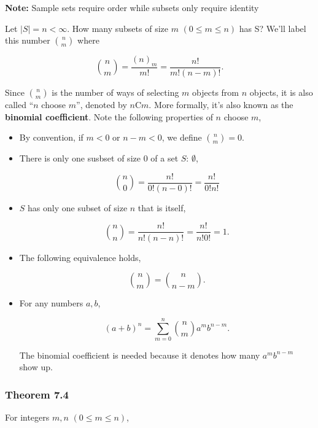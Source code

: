\documentclass[12pt]{article}
\begin{document}
\noindent
\textbf{Note:} Sample sets require order while subsets only require identity

\noindent
Let $\lvert S \rvert = n < \infty$. How many subsets of size $m$ $(0 \leq m \leq n)$ has S? We'll label this number ${n \choose m}$ where

\begin{equation*}
{n \choose m} = \frac{(n)_m}{m!} = \frac{n!}{m! (n-m)!}.
\end{equation*}

\noindent
Since ${n \choose m}$ is the number of ways of selecting $m$ objects from $n$ objects, it is also called ``$n$ choose $m$'', denoted by $n$C$m$. More formally, it's also known as the \textbf{binomial coefficient}. Note the following properties of $n$ choose $m$,

\begin{itemize}
\item By convention, if $m < 0$ or $n-m < 0$, we define ${n \choose m} = 0$.
\item There is only one susbset of size $0$ of a set $S$: $\emptyset$,

\begin{equation*}
{n \choose 0} = \frac{n!}{0! (n - 0)!} = \frac{n!}{0! n!}
\end{equation*}

\item $S$ has only one subset of size $n$ that is itself,

\begin{equation*}
{n \choose n} = \frac{n!}{n! (n-n)!} = \frac{n!}{n! 0!} = 1.
\end{equation*}

\item The following equivalence holds,

\begin{equation*}
{n \choose m} = {n \choose n-m}.
\end{equation*}

\item For any numbers $a,b$,

\begin{equation*}
(a+b)^n = \sum_{m=0}^{n} {n \choose m} a^m b^{n-m}.
\end{equation*} 

\noindent
The binomial coefficient is needed because it denotes how many $a^m b^{n-m}$ show up. 
\end{itemize}

\noindent
\subsubsection*{Theorem 7.4} For integers $m,n$ $(0 \leq m \leq n)$,
\end{document}
